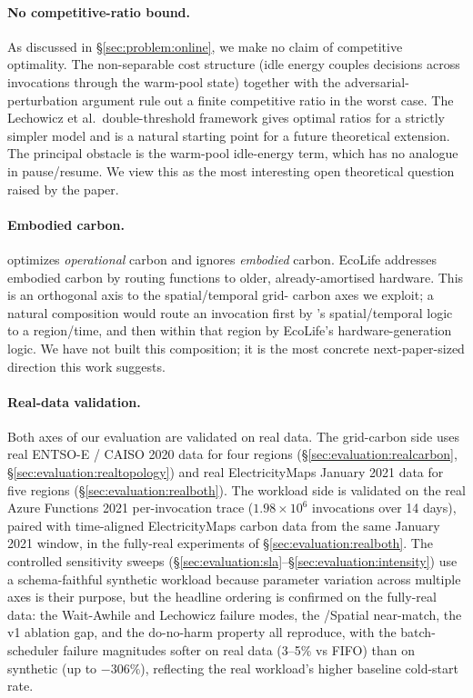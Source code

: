 \paragraph{No competitive-ratio bound.}
As discussed in \S\ref{sec:problem:online}, we make no claim of
competitive optimality. The non-separable cost structure (idle energy
couples decisions across invocations through the warm-pool state)
together with the adversarial-perturbation argument rule out a finite
competitive ratio in the worst case. The Lechowicz et al.\
double-threshold framework \citep{lechowicz2024online} gives optimal
ratios for a strictly simpler model and is a natural starting point
for a future theoretical extension. The principal obstacle is the
warm-pool idle-energy term, which has no analogue in pause/resume. We
view this as the most interesting open theoretical question raised
by the paper.

\paragraph{Embodied carbon.}
\label{sec:discussion:embodied}
\GreenFaaS{} optimizes \emph{operational} carbon and ignores
\emph{embodied} carbon. EcoLife \citep{jiang2024ecolife} addresses
embodied carbon by routing functions to older, already-amortised
hardware. This is an orthogonal axis to the spatial/temporal grid-
carbon axes we exploit; a natural composition would route an
invocation first by \GreenFaaS's spatial/temporal logic to a
region/time, and then within that region by EcoLife's
hardware-generation logic. We have not built this composition; it is
the most concrete next-paper-sized direction this work suggests.

\paragraph{Real-data validation.} Both axes of our evaluation are
validated on real data. The grid-carbon side uses real ENTSO-E /
CAISO 2020 data for four regions
(\S\ref{sec:evaluation:realcarbon}, \S\ref{sec:evaluation:realtopology})
and real ElectricityMaps January 2021 data for five regions
(\S\ref{sec:evaluation:realboth}). The workload side is validated on
the real Azure Functions 2021 per-invocation trace
($1.98 \times 10^6$ invocations over 14 days), paired with
time-aligned ElectricityMaps carbon data from the same January 2021
window, in the fully-real experiments of
\S\ref{sec:evaluation:realboth}. The controlled sensitivity sweeps
(\S\ref{sec:evaluation:sla}--\S\ref{sec:evaluation:intensity}) use a
schema-faithful synthetic workload because parameter variation across
multiple axes is their purpose, but the headline ordering is
confirmed on the fully-real data: the Wait-Awhile and Lechowicz
failure modes, the \GreenFaaS/Spatial near-match, the v1 ablation
gap, and the do-no-harm property all reproduce, with the
batch-scheduler failure magnitudes softer on real data (3--5\% vs
FIFO) than on synthetic (up to $-306\%$), reflecting the real
workload's higher baseline cold-start rate.

